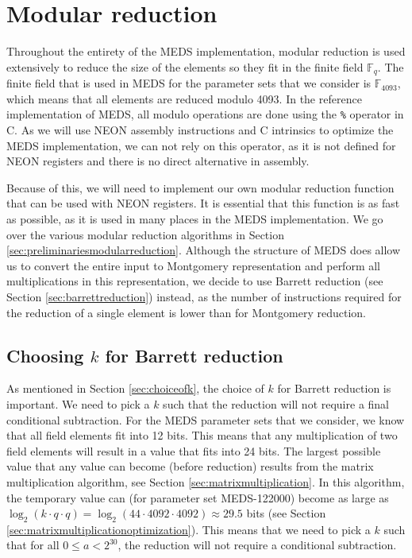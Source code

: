 \documentclass[11pt,a4paper]{report}
\theoremstyle{definition}
\begin{document}
\section{Modular reduction}
\label{sec:modularreduction}
Throughout the entirety of the MEDS implementation, modular reduction is used extensively to reduce the size of the elements so they fit in the finite field $\mathbb{F}_q$. The finite field that is used in MEDS for the parameter sets that we consider is $\mathbb{F}_{4093}$, which means that all elements are reduced modulo 4093. In the reference implementation of MEDS, all modulo operations are done using the \texttt{\%} operator in C. As we will use NEON assembly instructions and C intrinsics to optimize the MEDS implementation, we can not rely on this operator, as it is not defined for NEON registers and there is no direct alternative in assembly.

Because of this, we will need to implement our own modular reduction function that can be used with NEON registers. It is essential that this function is as fast as possible, as it is used in many places in the MEDS implementation. We go over the various modular reduction algorithms in Section \ref{sec:preliminariesmodularreduction}. Although the structure of MEDS does allow us to convert the entire input to Montgomery representation and perform all multiplications in this representation, we decide to use Barrett reduction (see Section \ref{sec:barrettreduction}) instead, as the number of instructions required for the reduction of a single element is lower than for Montgomery reduction.

\subsection{Choosing $k$ for Barrett reduction}
As mentioned in Section \ref{sec:choiceofk}, the choice of $k$ for Barrett reduction is important. We need to pick a $k$ such that the reduction will not require a final conditional subtraction. For the MEDS parameter sets that we consider, we know that all field elements fit into 12 bits. This means that any multiplication of two field elements will result in a value that fits into 24 bits. The largest possible value that any value can become (before reduction) results from the matrix multiplication algorithm, see Section \ref{sec:matrixmultiplication}. In this algorithm, the temporary value can (for parameter set MEDS-122000) become as large as $\log_2(k \cdot q \cdot q) = \log_2(44 \cdot 4092 \cdot 4092) \approx 29.5$ bits (see Section \ref{sec:matrixmultiplicationoptimization}). This means that we need to pick a $k$ such that for all $0 \leq a < 2^{30}$, the reduction will not require a conditional subtraction.
\end{document}
